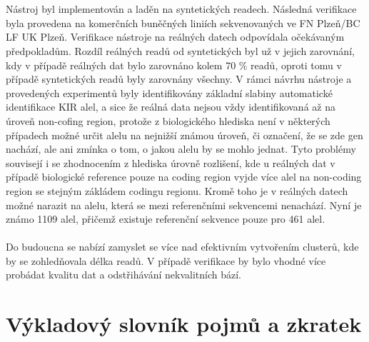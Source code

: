 \documentclass[czech,DP]{thesiskiv}
\numberwithin{equation}{section}
\begin{document}
\\
\\
Nástroj byl implementován a laděn na syntetických readech. Následná verifikace byla provedena na komerčních buněčných liniích sekvenovaných ve FN Plzeň/BC LF UK Plzeň. Verifikace nástroje na reálných datech odpovídala očekávaným předpokladům. Rozdíl reálných readů od syntetických byl už v jejich zarovnání, kdy v případě reálných dat bylo zarovnáno kolem 70 \% readů, oproti tomu v případě syntetických readů byly zarovnány všechny. V rámci návrhu nástroje a provedených experimentů byly identifikovány základní slabiny automatické identifikace KIR alel, a sice že reálná data nejsou vždy identifikovaná až na úroveň non-cofing region, protože z biologického hlediska není v některých případech možné určit alelu na nejnižší známou úroveň, či označení, že se zde gen nachází, ale ani zmínka o tom, o jakou alelu by se mohlo jednat. Tyto problémy souvisejí i se zhodnocením z hlediska úrovně rozlišení, kde u reálných dat v případě biologické reference pouze na coding region vyjde více alel na non-coding region se stejným zákládem codingu regionu. Kromě toho je v reálných datech možné narazit na alelu, která se mezi referenčními sekvencemi nenachází. Nyní je známo 1109 alel, přičemž existuje referenční sekvence pouze pro 461 alel.
\\
\\
Do budoucna se nabízí zamyslet se více nad efektivním vytvořením clusterů, kde by se zohledňovala délka readů. V případě verifikace by bylo vhodné více probádat kvalitu dat a odstřihávání nekvalitních bází. 


\chapter{Výkladový slovník pojmů a zkratek}
\end{document}
